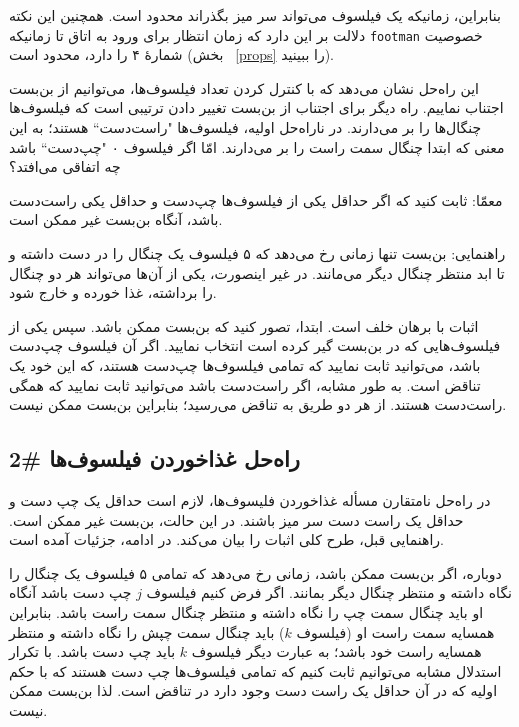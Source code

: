 \documentclass{book}
\newcommand{\clearemptydoublepage}{\newpage\cleardoublepage}
\begin{document}
    بنابراین، زمانیکه یک فیلسوف می‌تواند سر میز بگذراند محدود است. همچنین این نکته دلالت بر این دارد که زمان انتظار برای ورود به اتاق 
    تا زمانیکه {\tt footman}  خصوصیت شمارهٔ ۴ را دارد، محدود است (بخش ~\ref{props} را ببینید). 
     
    

    این راه‌حل نشان می‌دهد که با کنترل کردن تعداد فیلسوف‌ها، می‌توانیم از بن‌بست اجتناب نماییم. 
    راه دیگر برای اجتناب از بن‌بست تغییر دادن ترتیبی است  که فیلسوف‌ها چنگال‌ها را بر می‌دارند. 
    در ناراه‌حل اولیه، فیلسوف‌ها "راست‌دست`` هستند؛ به این معنی که ابتدا چنگال سمت راست را بر می‌دارند. 
    امّا اگر فیلسوف ۰ "چپ‌دست`` باشد چه اتفاقی می‌افتد؟‌

    معمّا: ثابت کنید که اگر حداقل یکی از فیلسوف‌ها چپ‌دست و حداقل یکی راست‌دست باشد، آنگاه بن‌بست غیر ممکن است. 

    راهنمایی: بن‌بست تنها زمانی رخ می‌دهد که ۵ فیلسوف یک چنگال را در دست داشته و تا ابد منتظر چنگال دیگر می‌مانند. 
    در غیر اینصورت، یکی از آن‌ها می‌تواند هر دو چنگال را برداشته، غذا خورده و خارج شود. 

    اثبات با برهان خلف است.  ابتدا، تصور کنید که بن‌بست ممکن باشد. 
    سپس یکی از فیلسوف‌هایی که در بن‌بست گیر کرده است انتخاب نمایید. 
    اگر آن فیلسوف چپ‌دست باشد،‌ می‌توانید ثابت نمایید که تمامی‌ فیلسوف‌ها چپ‌دست هستند، که این خود یک تناقض است. 
    به طور مشابه، اگر راست‌دست باشد می‌توانید ثابت نمایید که همگی راست‌دست هستند. از هر دو طریق به تناقض می‌رسید؛ بنابراین 
    بن‌بست ممکن نیست. 
    

\clearemptydoublepage
\subsection{راه‌حل غذاخوردن فیلسوف‌ها \#2}

    در راه‌حل نامتقارن مسأله غذاخوردن فلیسوف‌ها، لازم است حداقل یک چپ دست و  حداقل یک راست دست سر میز باشند. 
    در این حالت، بن‌بست غیر ممکن است. راهنمایی قبل، طرح کلی اثبات را بیان می‌کند.
    در ادامه، جزئیات آمده است. 

    دوباره، اگر بن‌بست ممکن باشد، زمانی رخ می‌دهد که تمامی ۵ فیلسوف یک چنگال را نگاه داشته و منتظر چنگال دیگر بمانند. 
    اگر فرض کنیم فیلسوف $j$ چپ دست باشد آنگاه او باید چنگال سمت چپ را نگاه داشته و منتظر چنگال سمت راست باشد. 
    بنابراین همسایه سمت راست او (فیلسوف $k$) باید چنگال سمت چپش را نگاه داشته و منتظر همسایه راست خود باشد؛ به عبارت دیگر 
    فیلسوف $k$ باید چپ دست باشد. 
    با تکرار استدلال مشابه می‌توانیم ثابت کنیم که تمامی فیلسوف‌ها چپ دست هستند که با حکم اولیه که در آن 
    حداقل یک راست دست وجود دارد در تناقض است. لذا بن‌بست ممکن نیست. 
\end{document}
